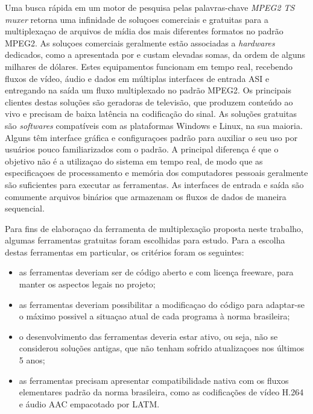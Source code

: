 \documentclass[
	12pt,				%
	openright,			%
	twoside,			%
	a4paper,			%
	brazil,
	french,				%
	english
	]{abntex2}
\begin{document}
Uma busca rápida em um motor de pesquisa pelas palavras-chave \textit{MPEG2 TS muxer} retorna uma infinidade de
soluçoes comerciais e gratuitas para a multiplexaçao de arquivos de mídia dos mais diferentes formatos no padrão
MPEG2. As soluçoes comerciais geralmente estão associadas a \textit{hardwares} dedicados, como a apresentada por
\cite{harris} e custam elevadas somas, da ordem de alguns milhares de dólares. Estes equipamentos funcionam em tempo
real, recebendo fluxos de vídeo, áudio e dados em múltiplas interfaces de entrada ASI e entregando na saída um fluxo
multiplexado no padrão MPEG2. Os principais clientes destas soluções são geradoras de televisão, que produzem conteúdo
ao vivo e precisam de baixa latência na codificação do sinal. As soluções gratuitas são \textit{softwares} compatíveis com as plataformas Windows e Linux, na sua maioria. Alguns têm interface gráfica e configuraçoes padrão para auxiliar o seu uso por usuários pouco familiarizados com o padrão. A principal diferença é que o objetivo não é a utilizaçao do sistema em tempo real, de modo que as especificaçoes de processamento e memória dos computadores pessoais geralmente são
suficientes para executar as ferramentas. As interfaces de entrada e saída são comumente arquivos binários que armazenam os fluxos de dados de maneira sequencial.

Para fins de elaboraçao da ferramenta de multiplexação proposta neste trabalho, algumas ferramentas gratuitas foram escolhidas para estudo. Para a escolha destas ferramentas em particular, os critérios foram os seguintes:

\begin{itemize}

\item{as ferramentas deveriam ser de código aberto e com licença freeware, para manter os aspectos legais no projeto;}

\item{as ferramentas deveriam possibilitar a modificaçao do código para adaptar-se o máximo possivel a situaçao atual de cada programa à norma brasileira;}

\item{o desenvolvimento das ferramentas deveria estar ativo, ou seja, não se considerou soluções antigas, que não tenham sofrido atualizaçoes nos últimos 5 anos;}

\item{as ferramentas precisam apresentar compatibilidade nativa com os fluxos elementares padrão da norma brasileira, como as codificações de vídeo H.264 e áudio AAC empacotado por LATM.}

\end{itemize}
\end{document}
